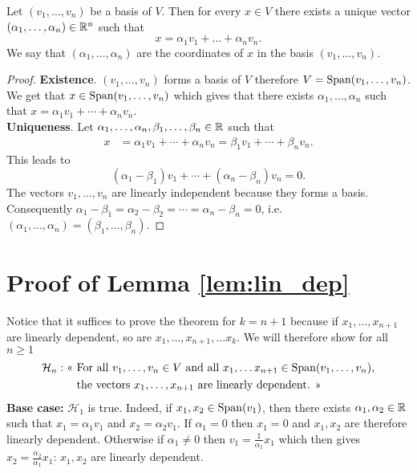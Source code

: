 \documentclass[11pt,nocut]{article}
\begin{document}
\begin{proposition}[Coordinates]
	Let $(v_1, \dots, v_n)$ be a basis of $V$. Then for every $x \in V$ there exists a unique vector $(\alpha_1, \dots, \alpha_n) \in \mathbb{R}^n$ such that
	$$
	x = \alpha_1 v_1 + \dots + \alpha_n v_n.
	$$
	We say that $(\alpha_1, \dots, \alpha_n)$ are the coordinates of $x$ in the basis $(v_1, \dots, v_n)$.
\end{proposition}
\begin{proof}
	\textbf{Existence}. $(v_1, \dots, v_n)$ forms a basis of $V$ therefore  $V = {{\rm Span}}(v_1, \dots, v_n)$. We get that $x \in {{\rm Span}}(v_1, \dots, v_n)$ which gives that there exists $\alpha_1, \dots, \alpha_n$ such that $x = \alpha_1 v_1 + \cdots + \alpha_n v_n$.
	\\
	\textbf{Uniqueness}. Let $\alpha_1, \dots, \alpha_n, \beta_1, \dots, \beta_n \in \mathbb{R}$ such that
	\begin{align*}
		x &= \alpha_1 v_1 + \cdots + \alpha_n v_n = \beta_1 v_1 + \cdots + \beta_n v_n.
	\end{align*}
	This leads to
	$$
	(\alpha_1 - \beta_1) v_1 + \cdots + (\alpha_n - \beta_n) v_n = 0.
	$$
	The vectors $v_1, \dots, v_n$ are linearly independent because they forms a basis. Consequently $\alpha_1 - \beta_1 = \alpha_2 - \beta_2 = \cdots =  \alpha_n - \beta_n = 0$, i.e.\ $(\alpha_1, \dots, \alpha_n) = (\beta_1, \dots, \beta_n)$.
\end{proof}


\section*{Proof of Lemma \ref{lem:lin_dep}}\label{sec:proof_lin_dep}
Notice that it suffices to prove the theorem for $k = n+1$ because if $x_1, \dots, x_{n+1}$ are linearly dependent, so are $x_1, \dots, x_{n+1}, \dots x_k$. We will therefore show for all $n \geq 1$
\begin{align*}
	\mathcal{H}_n: \text{<< } &\text{For all } v_1, \dots, v_{n} \in V \ \text{and all } x_{1}, \dots x_{n+1} \in {{\rm Span}}(v_1, \dots, v_n), \\ &\text{the vectors } x_1, \dots, x_{n+1} \ \text{are linearly dependent. >>}
\end{align*}
\textbf{Base case:} $\mathcal{H}_1$ is true. Indeed, if $x_1,x_2 \in {{\rm Span}}(v_1)$, then there exists $\alpha_1, \alpha_2 \in \mathbb{R}$ such that $x_1 = \alpha_1 v_1$ and $x_2 = \alpha_2 v_1$. If $\alpha_1 = 0$ then $x_1 = 0$ and $x_1,x_2$ are therefore linearly dependent. 
Otherwise if $\alpha_1 \neq 0$ then $v_1 = \frac{1}{\alpha_1} x_1$ which then gives $x_2 = \frac{\alpha_2}{\alpha_1} x_1$: $x_1,x_2$ are linearly dependent. 
\\
\end{document}
